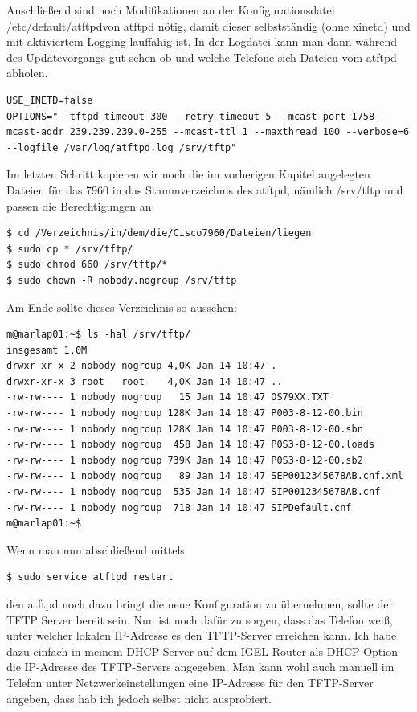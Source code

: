 \documentclass[a4paper,12pt]{scrbook}
\begin{document}
Anschließend sind noch Modifikationen an der Konfigurationsdatei /etc/default/atftpdvon atftpd nötig, damit dieser selbstständig (ohne xinetd) und mit aktiviertem Logging
lauffähig ist. In der Logdatei kann man dann während des Updatevorgangs gut sehen ob und welche Telefone sich Dateien vom atftpd abholen.

\begin{lstlisting}[caption={atftpd-Konfigurationsdatei /etc/default/atftpd},label=lst:atftpdconfig]
USE_INETD=false
OPTIONS="--tftpd-timeout 300 --retry-timeout 5 --mcast-port 1758 --mcast-addr 239.239.239.0-255 --mcast-ttl 1 --maxthread 100 --verbose=6 --logfile /var/log/atftpd.log /srv/tftp"
\end{lstlisting}

Im letzten Schritt kopieren wir noch die im vorherigen Kapitel angelegten Dateien für das 7960 in das Stammverzeichnis des atftpd, nämlich /srv/tftp und passen die Berechtigungen an:
\begin{lstlisting}
$ cd /Verzeichnis/in/dem/die/Cisco7960/Dateien/liegen
$ sudo cp * /srv/tftp/
$ sudo chmod 660 /srv/tftp/*
$ sudo chown -R nobody.nogroup /srv/tftp
\end{lstlisting}

Am Ende sollte dieses Verzeichnis so aussehen:

\begin{lstlisting}
m@marlap01:~$ ls -hal /srv/tftp/
insgesamt 1,0M
drwxr-xr-x 2 nobody nogroup 4,0K Jan 14 10:47 .
drwxr-xr-x 3 root   root    4,0K Jan 14 10:47 ..
-rw-rw---- 1 nobody nogroup   15 Jan 14 10:47 OS79XX.TXT
-rw-rw---- 1 nobody nogroup 128K Jan 14 10:47 P003-8-12-00.bin
-rw-rw---- 1 nobody nogroup 128K Jan 14 10:47 P003-8-12-00.sbn
-rw-rw---- 1 nobody nogroup  458 Jan 14 10:47 P0S3-8-12-00.loads
-rw-rw---- 1 nobody nogroup 739K Jan 14 10:47 P0S3-8-12-00.sb2
-rw-rw---- 1 nobody nogroup   89 Jan 14 10:47 SEP0012345678AB.cnf.xml
-rw-rw---- 1 nobody nogroup  535 Jan 14 10:47 SIP0012345678AB.cnf
-rw-rw---- 1 nobody nogroup  718 Jan 14 10:47 SIPDefault.cnf
m@marlap01:~$ 
\end{lstlisting}
Wenn man nun abschließend mittels

\begin{lstlisting}
$ sudo service atftpd restart
\end{lstlisting}

den atftpd noch dazu bringt die neue Konfiguration zu übernehmen, sollte der TFTP Server bereit sein. Nun ist noch dafür zu sorgen,
dass das Telefon weiß, unter welcher lokalen IP-Adresse es den TFTP-Server erreichen kann. Ich habe dazu einfach in meinem DHCP-Server
auf dem IGEL-Router als DHCP-Option die IP-Adresse des TFTP-Servers angegeben. Man kann wohl auch manuell im Telefon unter Netzwerkeinstellungen
eine IP-Adresse für den TFTP-Server angeben, dass hab ich jedoch selbst nicht ausprobiert.
\end{document}
